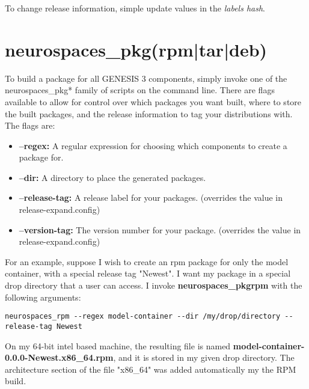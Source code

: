 \documentclass[12pt]{article}
\begin{document}
To change release information, simple update values in the {\it labels hash}. 

\section*{neurospaces\_pkg(rpm|tar|deb)}

To build a package for all GENESIS 3 components, simply invoke one of the neurospaces\_pkg* family of scripts on the command line. There are flags available to allow for control over which packages you want built, where to store the built packages, and the release information to tag your distributions with. The flags are:

\begin{itemize}
\item[] {\bf --regex:} A regular expression for choosing which components to create a package for. 
\item[] {\bf --dir:} A directory to place the generated packages.
\item[] {\bf --release-tag:} A release label for your packages. (overrides the value in release-expand.config)
\item[] {\bf --version-tag:} The version number for your package. (overrides the value in release-expand.config)
\end{itemize}

For an example, suppose I wish to create an rpm package for only the model container, with a special release tag "Newest". I want my package in a special drop directory that a user can access. I invoke {\bf neurospaces\_pkgrpm} with the following arguments:

\begin{verbatim}
neurospaces_rpm --regex model-container --dir /my/drop/directory --release-tag Newest 
\end{verbatim}

On my 64-bit intel based machine, the resulting file is named {\bf model-container-0.0.0-Newest.x86\_64.rpm}, and it is stored in my given drop directory. The architecture section of the file "x86\_64" was added automatically my the RPM build.
\end{document}
